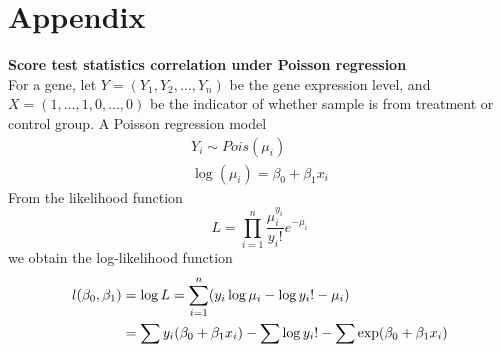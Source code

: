 \documentclass[11pt, a4paper]{article}
\begin{document}
\section{Appendix}
\begin{appendix}



    \textbf{
    Score test statistics correlation under Poisson regression}\\
    For a gene, let $Y= (Y_1, Y_2, \ldots, Y_n)$ be the gene expression level, and $X= (1, \ldots, 1, 0, \ldots, 0)$ be the indicator of whether sample is from treatment or control group. A Poisson regression model 
    \begin{align*}\label{poisson}
    Y_i\sim Pois(\mu_i) \\
    \log(\mu_i) = \beta_0 +\beta_1 x_i
    \end{align*}
    From the likelihood function 
    \[L = \prod_{i=1}^n \frac{\mu_i^{y_i}}{y_i!}e^{-\mu_i}\]
    we obtain the log-likelihood function
    \begin{align}\label{poissonLikelihood}
    l(\beta_0, \beta_1) & = \log L = \sum_{i=1}^n(y_i\log \mu_i - \log y_i! -\mu_i) \\ \notag
    & = \sum y_i(\beta_0 +\beta_1x_i) - \sum \log y_i! - \sum \exp(\beta_0 + \beta_1x_i) \notag
    \end{align}
    

\end{appendix}
\end{document}
